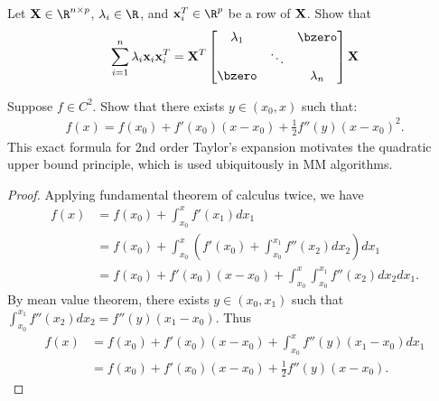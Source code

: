 \documentclass[some_latex_template.tex]{subfiles}
\begin{document}
\begin{problembox}{}{}
Let $\bX \in \R^{n \times p}$, $\lambda_i \in \R$, and $\bx_i^T \in \R^p$ be a row of $\mathbf{X}$. Show that
\begin{align*}
	\sum_{i=1}^n \lambda_i \bx_i\bx_i^T = \bX^T
	\begin{bmatrix}
		\lambda_1 & & \bzero \\
		& \ddots & \\
		\bzero & & \lambda_n
	\end{bmatrix} \bX
\end{align*}
\end{problembox}

\begin{problembox}{}{}
Suppose $f \in C^{2}$. Show that there exists $y \in (x_0, x)$ such that:
\begin{align*}
f(x) = f(x_0) + f'(x_0)(x - x_0) + \frac{1}{2} f''(y)(x - x_0)^2.
\end{align*}
This exact formula for 2nd order Taylor's expansion motivates the quadratic upper bound principle, which is used ubiquitously in MM algorithms.
\end{problembox}

\begin{proof}
Applying fundamental theorem of calculus twice, we have
\begin{align*}
	f(x) 
	&= f(x_0) + \int_{x_0}^x f'(x_1) dx_1\\
	&=f(x_0) + \int_{x_0}^x \left(f'(x_0) + \int_{x_0}^{x_1} f''(x_2)dx_2 \right)dx_1\\
	&= f(x_0) + f'(x_0)(x - x_0) + \int_{x_0}^x\int_{x_0}^{x_1}f''(x_2)dx_2dx_1.
\end{align*}
By mean value theorem, there exists $y \in (x_0, x_1)$ such that $\int_{x_0}^{x_1}f''(x_2)dx_2 = f''(y)(x_1 - x_0).$ Thus
\begin{align*}
	f(x)
	&= f(x_0) + f'(x_0)(x - x_0) +\int_{x_0}^x f''(y)(x_1 - x_0)dx_1\\
	&= f(x_0) + f'(x_0)(x - x_0) + \frac{1}{2}f''(y)(x - x_0).
\end{align*}
\end{proof}
\end{document}
